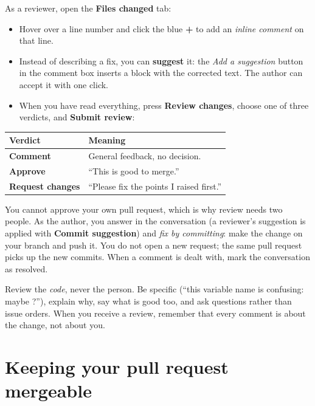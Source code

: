 As a reviewer, open the \textbf{Files changed} tab:

\begin{itemize}
  \item Hover over a line number and click the blue \textbf{+} to add an \emph{inline comment} on that line.
  \item Instead of describing a fix, you can \textbf{suggest} it: the \emph{Add a suggestion} button in the comment box inserts a block with the corrected text. The author can accept it with one click.
  \item When you have read everything, press \textbf{Review changes}, choose one of three verdicts, and \textbf{Submit review}:
\end{itemize}

\begin{center}
\small
\begin{tabular}{@{}l >{\raggedright\arraybackslash}p{9.4cm}@{}}
\toprule
Verdict & Meaning \\
\midrule
\textbf{Comment} & General feedback, no decision. \\
\textbf{Approve} & ``This is good to merge.'' \\
\textbf{Request changes} & ``Please fix the points I raised first.'' \\
\bottomrule
\end{tabular}
\end{center}

You cannot approve your own pull request, which is why review needs two people. As the author, you answer in the conversation (a reviewer's suggestion is applied with \textbf{Commit suggestion}) and \emph{fix by committing}: make the change on your branch and push it. You do not open a new request; the same pull request picks up the new commits. When a comment is dealt with, mark the conversation as resolved.

\begin{keyidea}
Review the \emph{code}, never the person. Be specific (``this variable name is confusing: maybe ?''), explain why, say what is good too, and ask questions rather than issue orders. When you receive a review, remember that every comment is about the change, not about you.
\end{keyidea}

\section{Keeping your pull request mergeable}

